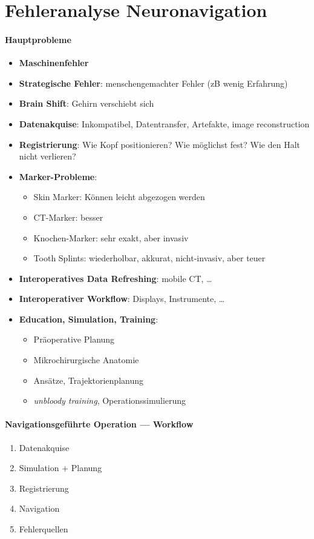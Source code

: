 \section*{Fehleranalyse Neuronavigation}

\paragraph{Hauptprobleme}
\begin{itemize}
  \item \textbf{Maschinenfehler}
  \item \textbf{Strategische Fehler}: menschengemachter Fehler (zB wenig Erfahrung)
  \item \textbf{Brain Shift}: Gehirn verschiebt sich
  \item \textbf{Datenakquise}: Inkompatibel, Datentransfer, Artefakte, image reconstruction
  \item \textbf{Registrierung}: Wie Kopf positionieren? Wie möglichst fest? Wie den Halt nicht verlieren?
  \item \textbf{Marker-Probleme}:
  \begin{itemize}
    \item Skin Marker: Können leicht abgezogen werden
    \item CT-Marker: besser
    \item Knochen-Marker: sehr exakt, aber invasiv
    \item Tooth Splints: wiederholbar, akkurat, nicht-invasiv, aber teuer
  \end{itemize}
  \item \textbf{Interoperatives Data Refreshing}: mobile CT, \dots
  \item \textbf{Interoperativer Workflow}: Displays, Instrumente, \dots
  \item \textbf{Education, Simulation, Training}:
  \begin{itemize}
    \item Präoperative Planung
    \item Mikrochirurgische Anatomie
    \item Ansätze, Trajektorienplanung
    \item \emph{unbloody training}, Operationssimulierung
  \end{itemize}
\end{itemize}

\paragraph{Navigationsgeführte Operation --- Workflow}
\begin{enumerate}
  \item Datenakquise
  \item Simulation + Planung
  \item Registrierung
  \item Navigation
  \item Fehlerquellen
\end{enumerate}
